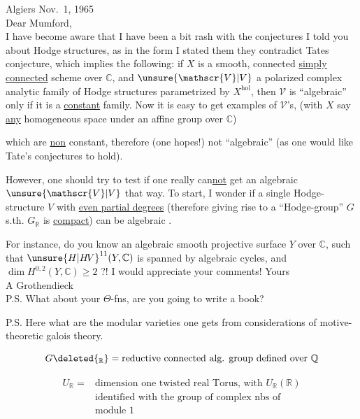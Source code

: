 Algiers Nov.~1, 1965\\
Dear Mumford,\\

I have become aware that I have been a bit rash with the conjectures I told you about Hodge structures, as in the form I stated them they contradict Tates conjecture, which implies the following: if $X$ is a smooth, connected \uline{simply connected} scheme over $\mathbb{C}$, and $\unsure{\mathscr{V}|V}$ a polarized complex analytic family of Hodge structures parametrized by $X^{\mathrm{hol}}$, then $\mathscr{V}$ is ``algebraic'' only if it is a \uline{constant} family. Now it is easy to get examples of $\mathscr{V}$'s, (with $X$ say \uline{any} homogeneous space under an affine group over $\mathbb{C}$)


which are \uline{non} constant, therefore (one hopes!) not ``algebraic'' (as one would like Tate's conjectures to hold).

However, one should try to test if one really can\uline{not} get an algebraic $\unsure{\mathscr{V}|V}$ that way. To start, I wonder if a single Hodge-structure $V$ with \uline{even partial degrees} (therefore giving rise to a ``Hodge-group'' $G$ s.th. $G_{\mathbb{R}}$ is \uline{compact}) can be algebraic .

For instance, do you know an algebraic smooth projective surface $Y$ over $\mathbb{C}$, such that ${\unsure{H|H\!V}}^{11}(Y,\mathbb{C})$ is spanned by algebraic cycles, and $\dim H^{0,2}(Y,\mathbb{C})\geq 2$ ?! I would appreciate your comments! \quad Yours\\
A Grothendieck\\

P.S. What about your $\Theta$-fns, are you going to write a book?


P.S. Here what are the modular varieties one gets from considerations of motive-theoretic galois theory.

\[
G\deleted{_{\mathbb{R}}}
= \text{reductive connected alg. group defined over }\mathbb{Q}
\]

\[
\begin{aligned}
U_{\mathbb{R}}={}&\text{dimension one twisted real Torus, with }U_{\mathbb{R}}(\mathbb{R})\\
&\text{identified with the group of complex nbs of}\\
&\text{module }1
\end{aligned}
\]

